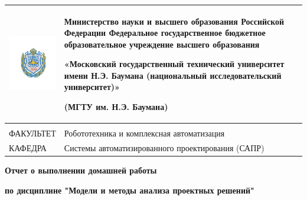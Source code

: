 \documentclass[12pt, a4paper]{article}
\newcommand{\Faculty}{Робототехника и комплексная автоматизация}
\newcommand{\Department}{Системы автоматизированного проектирования (САПР)}
\newcommand{\TitleText}{Отчет о выполнении домашней работы}
\newcommand{\Title}{{\Huge \textbf{\TitleText}}}
\newcommand{\SubTitleText}{по дисциплине "Модели и методы анализа проектных решений"}
\newcommand{\SubTitle}{{\LARGE \textbf{\SubTitleText}}}
\begin{document}
	\thispagestyle{empty}
	\begin{tabular}{m{0.15\linewidth}m{0.85\linewidth}}
	\centering
	\includegraphics[scale=0.07]{static/bmstu.pdf} &
	{\centering
	Министерство науки и высшего образования Российской Федерации
	Федеральное государственное бюджетное образовательное учреждение
	высшего образования
	
	«Московский государственный технический университет
	имени Н.Э. Баумана
	(национальный исследовательский университет)»
	
	(МГТУ им. Н.Э. Баумана)
	
    } \\
	\hline
	\multicolumn{1}{p{0.15\textwidth}}{} & \multicolumn{1}{p{0.85\textwidth}}{} \\
	\multicolumn{1}{p{0.15\textwidth}}{ФАКУЛЬТЕТ}	&	\multicolumn{1}{p{0.85\textwidth}}{\Faculty}	\\
	\multicolumn{1}{p{0.15\textwidth}}{КАФЕДРА}	&	\multicolumn{1}{p{0.85\textwidth}}{\Department}	\\
	\end{tabular}
\vfil

\begin{center}
	\Title
	
	\SubTitle
\end{center}
\end{document}
